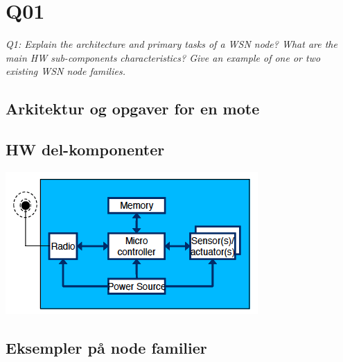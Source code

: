 \chapter{Q01}
\emph{Q1: Explain the architecture and primary tasks of a WSN node? What are
the main HW sub-components characteristics? Give an example of one or two
existing WSN node families.}

\section{Arkitektur og opgaver for en mote}

\section{HW del-komponenter}

\begin{center}
 \includegraphics[scale=0.5]{img/moteAnatomy.png}
\end{center}

\section{Eksempler på node familier}
